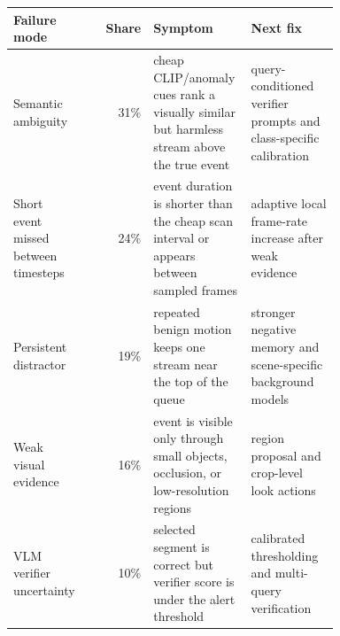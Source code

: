 \begingroup\setlength{\tabcolsep}{3pt}
\begin{tabular}{>{\raggedright\arraybackslash}p{0.16\linewidth}r>{\raggedright\arraybackslash}p{0.30\linewidth}>{\raggedright\arraybackslash}p{0.27\linewidth}}
\toprule
Failure mode & Share & Symptom & Next fix \\
\midrule
Semantic ambiguity & 31\% & cheap CLIP/anomaly cues rank a visually similar but harmless stream above the true event & query-conditioned verifier prompts and class-specific calibration \\
Short event missed between timesteps & 24\% & event duration is shorter than the cheap scan interval or appears between sampled frames & adaptive local frame-rate increase after weak evidence \\
Persistent distractor & 19\% & repeated benign motion keeps one stream near the top of the queue & stronger negative memory and scene-specific background models \\
Weak visual evidence & 16\% & event is visible only through small objects, occlusion, or low-resolution regions & region proposal and crop-level look actions \\
VLM verifier uncertainty & 10\% & selected segment is correct but verifier score is under the alert threshold & calibrated thresholding and multi-query verification \\
\bottomrule
\end{tabular}
\endgroup
